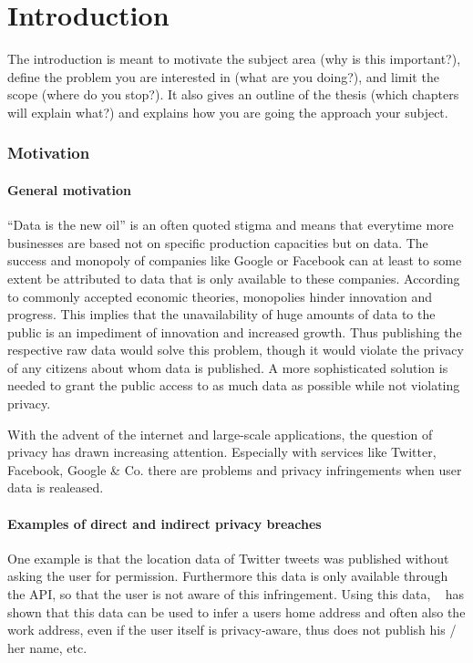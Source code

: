 
\chapter{Introduction}\label{chapter:introduction}

The introduction is meant to motivate the subject area (why is this important?),
define the problem you are interested in (what are you doing?), and limit the
scope (where do you stop?). It also gives an outline of the thesis (which chapters
will explain what?) and explains how you are going the approach your subject.
\\
\subsection{Motivation}
\subsubsection{General motivation}
“Data is the new oil” is an often quoted stigma and means that everytime more businesses are
based not on specific production capacities but on data. The success and monopoly of
companies like Google or Facebook can at least to some extent be attributed to data that is only
available to these companies.
According to commonly accepted economic theories, monopolies hinder innovation and
progress. This implies that the unavailability of huge amounts of data to the public is an
impediment of innovation and increased growth.
Thus publishing the respective raw data would solve this problem, though it would violate the
privacy of any citizens about whom data is published. A more sophisticated solution is needed
to grant the public access to as much data as possible while not violating privacy.

With the advent of the internet and large-scale applications, the question of privacy has drawn increasing attention.
Especially with services like Twitter, Facebook, Google \& Co. there are problems and privacy infringements when user data is realeased.

\subsubsection{Examples of direct and indirect privacy breaches}

One example is that the location data of Twitter tweets was published without asking the user for permission. Furthermore this data is only available through the API,
so that the user is not aware of this infringement. Using this data, ~\parencite{twitter} has shown that this data can be used to infer a users home address and often also the work address, even if the user itself is privacy-aware, thus does not publish his / her name, etc.


